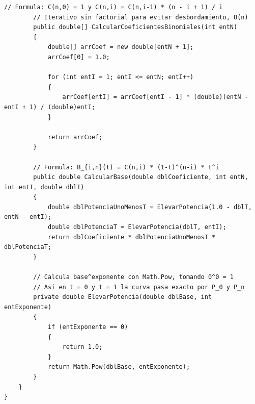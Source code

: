 \begin{lstlisting}[language={[Sharp]C}, caption={Clase clsEvaluadorBernstein (evaluacion con polinomios de Bernstein).}, label={lst:anx_bernstein}]
        // Formula: C(n,0) = 1 y C(n,i) = C(n,i-1) * (n - i + 1) / i
        // Iterativo sin factorial para evitar desbordamiento, O(n)
        public double[] CalcularCoeficientesBinomiales(int entN)
        {
            double[] arrCoef = new double[entN + 1];
            arrCoef[0] = 1.0;

            for (int entI = 1; entI <= entN; entI++)
            {
                arrCoef[entI] = arrCoef[entI - 1] * (double)(entN - entI + 1) / (double)entI;
            }

            return arrCoef;
        }

        // Formula: B_{i,n}(t) = C(n,i) * (1-t)^(n-i) * t^i
        public double CalcularBase(double dblCoeficiente, int entN, int entI, double dblT)
        {
            double dblPotenciaUnoMenosT = ElevarPotencia(1.0 - dblT, entN - entI);
            double dblPotenciaT = ElevarPotencia(dblT, entI);
            return dblCoeficiente * dblPotenciaUnoMenosT * dblPotenciaT;
        }

        // Calcula base^exponente con Math.Pow, tomando 0^0 = 1
        // Asi en t = 0 y t = 1 la curva pasa exacto por P_0 y P_n
        private double ElevarPotencia(double dblBase, int entExponente)
        {
            if (entExponente == 0)
            {
                return 1.0;
            }
            return Math.Pow(dblBase, entExponente);
        }
    }
}
\end{lstlisting}

